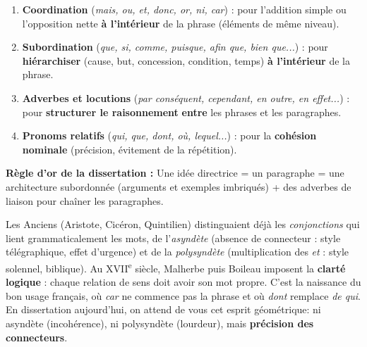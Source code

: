 \documentclass[11pt]{article}
\begin{document}
\begin{aretenir}
\begin{enumerate}
    \item \textbf{Coordination} (\emph{mais, ou, et, donc, or, ni, car}) : pour l'addition simple ou l'opposition nette \textbf{à l'intérieur} de la phrase (éléments de même niveau).
    \item \textbf{Subordination} (\emph{que, si, comme, puisque, afin que, bien que...}) : pour \textbf{hiérarchiser} (cause, but, concession, condition, temps) \textbf{à l'intérieur} de la phrase.
    \item \textbf{Adverbes et locutions} (\emph{par conséquent, cependant, en outre, en effet...}) : pour \textbf{structurer le raisonnement} \textbf{entre} les phrases et les paragraphes.
    \item \textbf{Pronoms relatifs} (\emph{qui, que, dont, où, lequel...}) : pour la \textbf{cohésion nominale} (précision, évitement de la répétition).
\end{enumerate}
\textbf{Règle d'or de la dissertation :} \og Une idée directrice = un paragraphe = une architecture subordonnée (arguments et exemples imbriqués) + des adverbes de liaison pour chaîner les paragraphes.\fg
\end{aretenir}

\begin{savaistu}
Les Anciens (Aristote, Cicéron, Quintilien) distinguaient déjà les \emph{conjonctions} qui lient grammaticalement les mots, de l'\emph{asyndète} (absence de connecteur : style télégraphique, effet d'urgence) et de la \emph{polysyndète} (multiplication des \emph{et} : style solennel, biblique). Au XVII\textsuperscript{e} siècle, Malherbe puis Boileau imposent la \textbf{clarté logique} : chaque relation de sens doit avoir son mot propre. C'est la naissance du \og bon usage\fg{} français, où \emph{car} ne commence pas la phrase et où \emph{dont} remplace \emph{de qui}. En dissertation aujourd'hui, on attend de vous cet \og esprit géométrique\fg : ni asyndète (incohérence), ni polysyndète (lourdeur), mais \textbf{précision des connecteurs}.
\end{savaistu}
\end{document}
